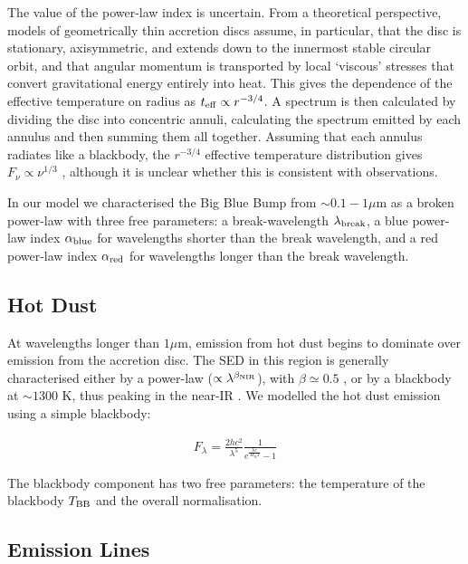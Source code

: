 The value of the power-law index is uncertain. 
From a theoretical perspective, models of geometrically thin accretion discs \citep{shakura73} assume, in particular, that the disc is stationary, axisymmetric, and extends down to the innermost stable circular orbit, and that angular momentum is transported by local `viscous' stresses that convert gravitational energy entirely into heat. 
This gives the dependence of the effective temperature on radius as $t_{\rm eff} \propto r^{-3/4}$. 
A spectrum is then calculated by dividing the disc into concentric annuli, calculating the spectrum emitted by each annulus and then summing them all together. 
Assuming that each annulus radiates like a blackbody, the $r^{-3/4}$ effective temperature distribution gives $F_\nu \propto \nu^{1/3}$ \citep{peterson95}, although it is unclear whether this is consistent with observations.    

In our model we characterised the Big Blue Bump from $\sim 0.1 - 1 \mu$m as a broken power-law with three free parameters: a break-wavelength $\lambda_{\rm break}$, a blue power-law index $\alpha_{\rm blue}$ for wavelengths shorter than the break wavelength, and a red power-law index $\alpha_{\rm red}$ for wavelengths longer than the break wavelength.   

\subsection{Hot Dust}

At wavelengths longer than $1\mu$m, emission from hot dust begins to dominate over emission from the accretion disc. 
The SED in this region is generally characterised either by a power-law ($\propto \lambda^{\beta_{\rm NIR}}$), with $\beta \simeq 0.5$ \citep[e.g.][]{richards06, zhang14}, or by a blackbody at $\sim 1300$ K, thus peaking in the near-IR \citep[e.g.][]{leipski14}. 
We modelled the hot dust emission using a simple blackbody:

\begin{eqnarray}  
  F_\lambda =\frac{2 hc^2}{\lambda^5}\frac{1}{ e^{\frac{hc}{\lambda k_\mathrm{B}T}} - 1} 
\end{eqnarray}

The blackbody component has two free parameters: the temperature of the blackbody $T_{\rm BB}$ and the overall normalisation. 
 
\subsection{Emission Lines}

